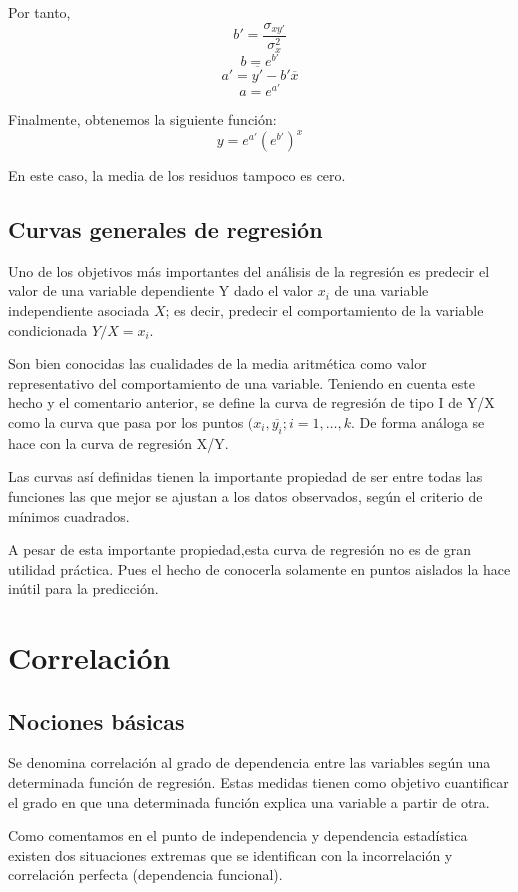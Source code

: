 \documentclass{article}
\theoremstyle{definition}
\begin{document}
	Por tanto,
	$$ b' = \frac{\sigma_{xy'} }{\sigma_{x}^2} $$
	$$ b = e^{b'} $$
	$$ a' = \overline{y'} - b'\overline{x} $$
	$$ a = e^{a'} $$

	Finalmente, obtenemos la siguiente función:
	$$ y = e^{a'}(e^{b'})^{x} $$

	En este caso, la media de los residuos tampoco es cero.


\subsection{Curvas generales de regresión}

Uno de los objetivos más importantes del análisis de la regresión es predecir el
valor de una variable dependiente Y dado el valor $x_i$ de una variable
independiente asociada $X$; es decir, predecir el comportamiento de la variable
condicionada $Y/X = x_i$.

Son bien conocidas las cualidades de la media aritmética como valor
representativo del comportamiento de una variable. Teniendo en cuenta este hecho
y el comentario anterior, se define la curva de regresión de tipo I de Y/X como
la curva que pasa por los puntos $(x_i,\overline{y_i}; i = 1,\ldots,k $.
De forma análoga se hace con la curva de regresión X/Y.

Las curvas así definidas tienen la importante propiedad de ser entre todas las
funciones las que mejor se ajustan a los datos observados, según el criterio de
mínimos cuadrados.

A pesar de esta importante propiedad,esta curva de regresión no es de gran
utilidad práctica. Pues el hecho de conocerla solamente en puntos aislados la
hace inútil para la predicción.

\section{Correlación}

\subsection{Nociones básicas}

Se denomina correlación al grado de dependencia entre las variables según una
determinada función de regresión. Estas medidas tienen como objetivo cuantificar
el grado en que una determinada función explica una variable a partir de otra.

Como comentamos en el punto de independencia y dependencia estadística existen
dos situaciones extremas que se identifican con la incorrelación y correlación
perfecta (dependencia funcional).
\end{document}
